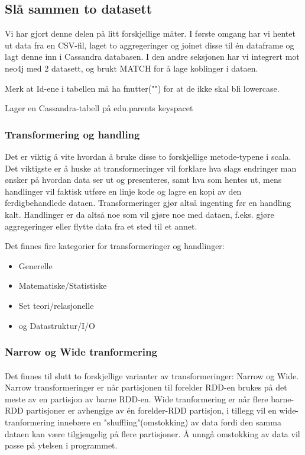 \subsection{Slå sammen to datasett}
Vi har gjort denne delen på litt forskjellige måter. I første omgang har vi hentet ut data fra en CSV-fil, laget to aggregeringer og joinet disse til én dataframe og lagt denne inn i Cassandra databasen. I den andre seksjonen har vi integrert mot neo4j med 2 datasett, og brukt MATCH for å lage koblinger i dataen.

Merk at Id-ene i tabellen må ha fnutter("") for at de ikke skal bli lowercase.




\large
Lager en Cassandra-tabell på edu.parents keyspacet

\subsubsection{Transformering og handling}
Det er viktig å vite hvordan å bruke disse to forskjellige metode-typene i scala. Det viktigste er å huske at transformeringer vil forklare hva slags endringer man ønsker på hvordan data ser ut og presenteres, samt hva som hentes ut, mens handlinger vil faktisk utføre en linje kode og lagre en kopi av den ferdigbehandlede dataen. Transformeringer gjør altså ingenting før en handling kalt. Handlinger er da altså noe som vil gjøre noe med dataen, f.eks. gjøre aggregeringer eller flytte data fra et sted til et annet.

Det finnes fire kategorier for transformeringer og handlinger:

\begin{itemize}
    \item Generelle
    \item Matematiske/Statistiske
    \item Set teori/relasjonelle
    \item og Datastruktur/I/O
\end{itemize}

\subsubsection{Narrow og Wide tranformering}
\paragraph{}
Det finnes til slutt to forskjellige varianter av transformeringer: Narrow og Wide. Narrow transformeringer er når partisjonen til forelder RDD-en brukes på det meste av en partisjon av barne RDD-en. Wide tranformering er når flere barne-RDD partisjoner er avhengige av én forelder-RDD partisjon, i tillegg vil en wide-tranformering innebære en "shuffling"(omstokking) av data fordi den samma dataen kan være tilgjengelig på flere partisjoner. Å unngå omstokking av data vil passe på ytelsen i programmet.

